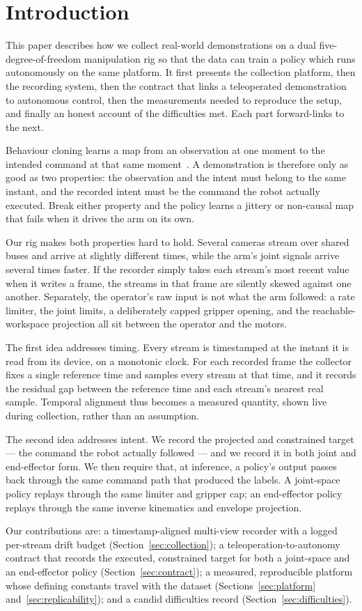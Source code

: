 \section{Introduction}

This paper describes how we collect real-world demonstrations on a dual
five-degree-of-freedom manipulation rig so that the data can train a
policy which runs autonomously on the same platform. It first presents the
collection platform, then the recording system, then the contract that
links a teleoperated demonstration to autonomous control, then the
measurements needed to reproduce the setup, and finally an honest account
of the difficulties met. Each part forward-links to the next.

Behaviour cloning learns a map from an observation at one moment to the
intended command at that same moment~\citep{ross2011dagger}. A
demonstration is therefore only as good as two properties: the observation and the intent must belong to the
same instant, and the recorded intent must be the command the robot
actually executed. Break either property and the policy learns a jittery
or non-causal map that fails when it drives the arm on its own.

Our rig makes both properties hard to hold. Several cameras stream over
shared buses and arrive at slightly different times, while the arm's joint
signals arrive several times faster. If the recorder simply takes each
stream's most recent value when it writes a frame, the streams in that
frame are silently skewed against one another. Separately, the operator's
raw input is not what the arm followed: a rate limiter, the joint limits, a
deliberately capped gripper opening, and the reachable-workspace projection
all sit between the operator and the motors.

The first idea addresses timing. Every stream is timestamped at the instant
it is read from its device, on a monotonic clock. For each recorded frame
the collector fixes a single reference time and samples every stream at
that time, and it records the residual gap between the reference time and
each stream's nearest real sample. Temporal alignment thus becomes a
measured quantity, shown live during collection, rather than an assumption.

The second idea addresses intent. We record the projected and constrained
target --- the command the robot actually followed --- and we record it in
both joint and end-effector form. We then require that, at inference, a
policy's output passes back through the same command path that produced the
labels. A joint-space policy replays through the same limiter and gripper
cap; an end-effector policy replays through the same inverse kinematics and
envelope projection.

Our contributions are: a timestamp-aligned multi-view recorder with a
logged per-stream drift budget (Section~\ref{sec:collection}); a
teleoperation-to-autonomy contract that records the executed, constrained
target for both a joint-space and an end-effector policy
(Section~\ref{sec:contract}); a measured, reproducible platform whose
defining constants travel with the dataset (Sections~\ref{sec:platform}
and~\ref{sec:replicability}); and a candid difficulties record
(Section~\ref{sec:difficulties}).

